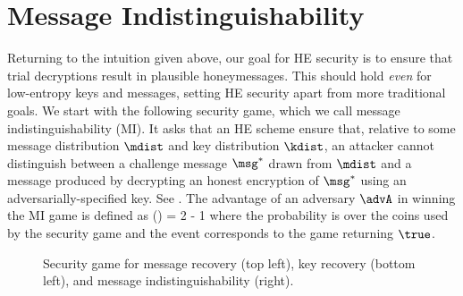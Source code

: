 \section{Message Indistinguishability}


Returning to the intuition given above, our goal 
for HE security is to ensure that trial decryptions result in plausible 
honeymessages. This should hold \emph{even} for low-entropy keys and 
messages, setting HE security apart from more traditional goals.
We start with the following security game, which we call 
message indistinguishability (MI). It asks that an HE scheme ensure that,
relative to some message distribution $\mdist$  and key distribution $\kdist$,
an attacker cannot distinguish between a challenge message $\msg^*$ drawn from $\mdist$
and a message produced by decrypting an honest encryption of $\msg^*$ using an
adversarially-specified key. See . The advantage of an adversary
$\advA$ in winning the MI game is defined as 
\bnm
  \AdvMI{\HEscheme,\mdist,\kdist}(\advA) = 2\cdotsm\Prob{\MI_{\HEscheme,\mdist,\kdist}^\advA \Rightarrow \true} - 1
\enm
where the probability is over the coins used by the security game and the event corresponds
to the game returning $\true$. 

\begin{figure}[t]
\center
{}
\caption{Security game for message recovery (top left), key recovery (bottom left),
and message indistinguishability (right).}
\label{fig:mi-sec}
\end{figure}


